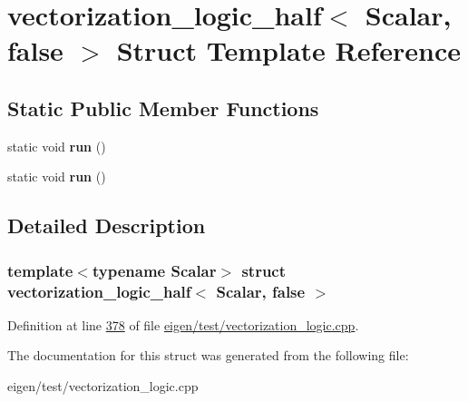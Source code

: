 \hypertarget{structvectorization__logic__half_3_01_scalar_00_01false_01_4}{}\section{vectorization\+\_\+logic\+\_\+half$<$ Scalar, false $>$ Struct Template Reference}
\label{structvectorization__logic__half_3_01_scalar_00_01false_01_4}
\subsection*{Static Public Member Functions}
\begin{DoxyCompactItemize}
\item 
\mbox{\label{structvectorization__logic__half_3_01_scalar_00_01false_01_4_ae70f980432c4d733208e6cbf4ba8d372}} 
static void {\bfseries run} ()
\item 
\mbox{\label{structvectorization__logic__half_3_01_scalar_00_01false_01_4_ae70f980432c4d733208e6cbf4ba8d372}} 
static void {\bfseries run} ()
\end{DoxyCompactItemize}


\subsection{Detailed Description}
\subsubsection*{template$<$typename Scalar$>$\newline
struct vectorization\+\_\+logic\+\_\+half$<$ Scalar, false $>$}



Definition at line \hyperlink{eigen_2test_2vectorization__logic_8cpp_source_l00378}{378} of file \hyperlink{eigen_2test_2vectorization__logic_8cpp_source}{eigen/test/vectorization\+\_\+logic.\+cpp}.



The documentation for this struct was generated from the following file\+:\begin{DoxyCompactItemize}
\item 
eigen/test/vectorization\+\_\+logic.\+cpp\end{DoxyCompactItemize}
